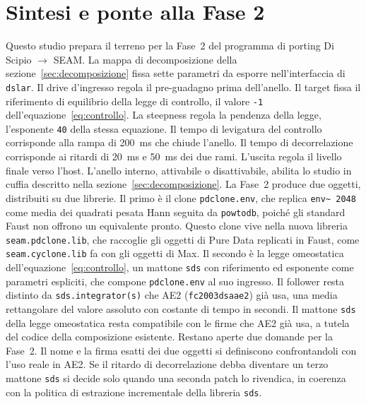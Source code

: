 \documentclass[11pt,a4paper]{article}
\begin{document}
\section{Sintesi e ponte alla Fase 2}\label{sec:sintesi}
Questo studio prepara il terreno per la Fase~2 del programma di porting Di Scipio $\to$ SEAM.
La mappa di decomposizione della sezione~\ref{sec:decomposizione} fissa sette parametri da esporre nell'interfaccia di \texttt{dslar}.
Il drive d'ingresso regola il pre-guadagno prima dell'anello.
Il target fissa il riferimento di equilibrio della legge di controllo, il valore \texttt{-1} dell'equazione~\eqref{eq:controllo}.
La steepness regola la pendenza della legge, l'esponente \texttt{40} della stessa equazione.
Il tempo di levigatura del controllo corrisponde alla rampa di \SI{200}{\milli\second} che chiude l'anello.
Il tempo di decorrelazione corrisponde ai ritardi di \SI{20}{\milli\second} e \SI{50}{\milli\second} dei due rami.
L'uscita regola il livello finale verso l'host.
L'anello interno, attivabile o disattivabile, abilita lo studio in cuffia descritto nella sezione~\ref{sec:decomposizione}.
La Fase~2 produce due oggetti, distribuiti su due librerie.
Il primo è il clone \texttt{pdclone.env}, che replica \texttt{env\textasciitilde{} 2048} come media dei quadrati pesata Hann seguita da \texttt{powtodb}, poiché gli standard Faust non offrono un equivalente pronto.
Questo clone vive nella nuova libreria \texttt{seam.pdclone.lib}, che raccoglie gli oggetti di Pure Data replicati in Faust, come \texttt{seam.cyclone.lib} fa con gli oggetti di Max.
Il secondo è la legge omeostatica dell'equazione~\eqref{eq:controllo}, un mattone \texttt{sds} con riferimento ed esponente come parametri espliciti, che compone \texttt{pdclone.env} al suo ingresso.
Il follower resta distinto da \texttt{sds.integrator(s)} che AE2 (\texttt{fc2003dsaae2}) già usa, una media rettangolare del valore assoluto con costante di tempo in secondi.
Il mattone \texttt{sds} della legge omeostatica resta compatibile con le firme che AE2 già usa, a tutela del codice della composizione esistente.
Restano aperte due domande per la Fase~2.
Il nome e la firma esatti dei due oggetti si definiscono confrontandoli con l'uso reale in AE2.
Se il ritardo di decorrelazione debba diventare un terzo mattone \texttt{sds} si decide solo quando una seconda patch lo rivendica, in coerenza con la politica di estrazione incrementale della libreria \texttt{sds}.
\end{document}
